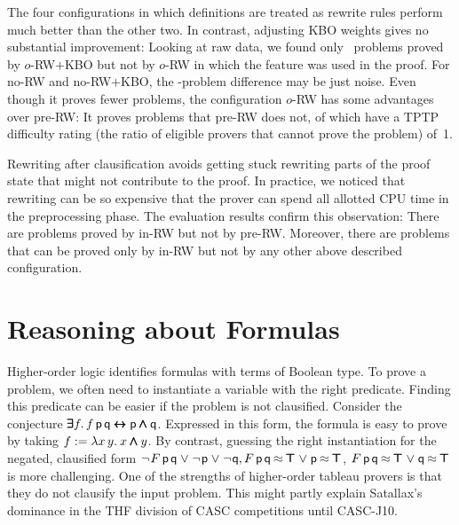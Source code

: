 \documentclass[smallcondensed,draft]{svjour3}     %
\begin{document}
The four configurations in which definitions are treated as rewrite rules
perform much better than the other two. In contrast, adjusting KBO weights gives
no substantial improvement: Looking at raw data, we found only
~problems proved by $o$-RW$+$KBO but not by $o$-RW in which the
feature was used in the proof. For no-RW and no-RW$+$KBO, the
-problem difference may be just noise. Even though it proves fewer
problems, the configuration $o$-RW has some advantages over pre-RW: It proves
 problems that pre-RW does not,  of which have a TPTP
difficulty rating (the ratio of eligible %
provers that cannot prove the problem) of~1.

Rewriting after clausification avoids getting stuck rewriting parts of the
proof state that might not contribute to the proof. In practice, we noticed that
rewriting can be so expensive that the prover can spend all
allotted CPU time in the preprocessing phase. The evaluation results confirm this
observation: There are  problems proved by in-RW but not by
pre-RW. Moreover, there are  problems that can be proved only
by in-RW but not by any other above described configuration. %

\section{Reasoning about Formulas}
\label{sec:satfol:ho-tech:formulas}

Higher-order logic identifies formulas with terms of Boolean type. To prove a problem, we often
need to instantiate a variable with the right predicate.
Finding this predicate can be easier if the problem is not clausified.
Consider the conjecture $\pmb\exists f. \, f \, {\mathsf{p}} \, {\mathsf{q}} \pmb\leftrightarrow {\mathsf{p}}
\pmb\land {\mathsf{q}}$. Expressed in this form, the formula is easy to prove by taking
$f := \lambda x \, y. \> x  \pmb\land y$. By contrast, guessing the right
instantiation for the negated, clausified form $ \neg{\kern.2ex F \, {\mathsf{p}} \,
{\mathsf{q}}} \mathrel\lor \neg{\kern.2ex {\mathsf{p}}} \mathrel\lor \neg{\kern.2ex {\mathsf{q}}},
F \, {\mathsf{p}} \, {\mathsf{q}} \mathbin{\approx} \pmb\top \mathrel\lor {\mathsf{p}} \mathbin{\approx} \pmb\top$, $F \, {\mathsf{p}}
\, {\mathsf{q}} \mathbin{\approx} \pmb\top \mathrel\lor {\mathsf{q}} \mathbin{\approx} \pmb\top$ is more challenging.
One of the strengths of higher-order tableau provers is that they do not clausify the input
problem. This might partly explain Satallax's dominance in the THF division of CASC
competitions until CASC-J10.
\end{document}
